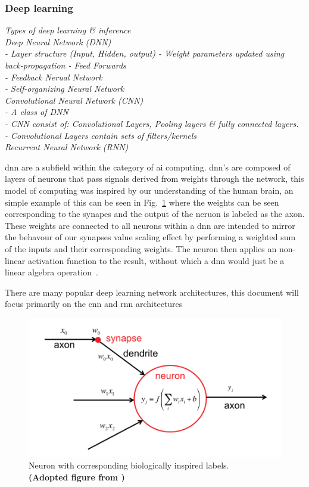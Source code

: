 \documentclass[11pt]{article}
\begin{document}
\subsubsection{Deep learning}\label{subsec:deepLearning}
\emph{
Types of deep learning \& inference\\
Deep Neural Network (DNN)\\
 - Layer structure (Input, Hidden, output)
 - Weight parameters updated using back-propagation
 - Feed Forwards\\
 - Feedback Nerual Network\\
 - Self-organizing Neural Network\\
Convolutional Neural Network (CNN)\\
 - A class of DNN\\
 - CNN consist of: Convolutional Layers, Pooling layers \& fully connected layers.\\
 - Convolutional Layers contain sets of filters/kernels\\
Recurrent Neural Network (RNN)\\
}

\Acrfull{dnn} are a subfield within the category of \Acrfull{ai} computing. \Acrshort{dnn}'s are composed of layers of neurons that pass signals derived from weights through the network, this model of computing was inspired by our understanding of the human brain, an simple example of this can be seen in Fig.~\ref{fig:neuronLabeled} where the weights can be seen corresponding to the synapes and the output of the neruon is labeled as the axon. These weights are connected to all neurons within a \Acrshort{dnn} are intended to mirror the behavour of our synapses value scaling effect by performing a weighted sum of the inputs and their corresponding weights. The neuron then applies an  non-linear activation function to the result, without which a \Acrshort{dnn} would just be a linear algebra operation~\autocite{szeEfficientProcessingDeep2017}.

There are many popular deep learning network architectures, this document will focus primarily on the \Acrfull{cnn} and \Acrfull{rnn} architectures


\begin{figure}
    \includegraphics{Perceptron_efficient_proc.png}
    \caption{Neuron with corresponding biologically inspired labels.\\ \textbf{(Adopted figure from \autocite{szeEfficientProcessingDeep2017})}}
    \label{fig:neuronLabeled}
\end{figure}
\end{document}

